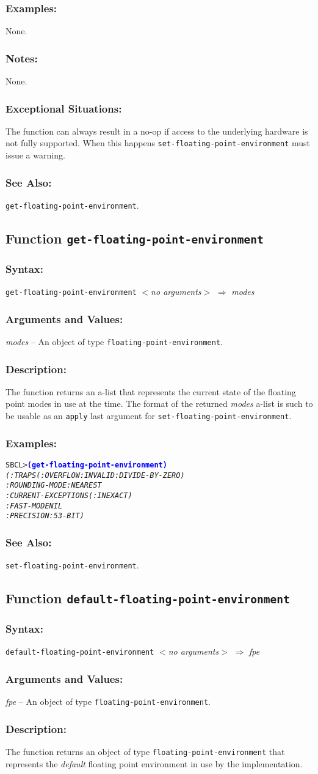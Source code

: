 \documentclass[10pt,fleqn]{article}
\newcommand{\code}[1]{\texttt{#1}}
\newcommand{\varname}[1]{\textit{#1}}
\newcommand{\codeprompt}[1]{\textcolor{blue}{\textbf{#1}}}
\newcommand{\DDictionaryItem}[1]{\vspace*{6pt}\noindent\hrulefill\vspace*{-9pt}\subsection*{#1}}
\newcommand{\DSyntax}{\subsubsection*{Syntax:}}
\newcommand{\DArgsNValues}{\subsubsection*{Arguments and Values:}}
\newcommand{\DDescription}{\subsubsection*{Description:}}
\newcommand{\DExamples}{\subsubsection*{Examples:}}
\newcommand{\DExceptional}{\subsubsection*{Exceptional Situations:}}
\newcommand{\DNotes}{\subsubsection*{Notes:}}
\newcommand{\DSeeAlso}{\subsubsection*{See Also:}}
\begin{document}
\DExamples{}

None.


\DNotes{}

None.


\DExceptional{}

The function can always result in a no-op if access to the underlying
hardware is not fully supported.  When this happens
\code{set-floating-point-environment} must issue a warning.


\DSeeAlso{}

\code{get-floating-point-environment}.


\DDictionaryItem{Function \code{get-floating-point-environment}}

\DSyntax{}

\code{get-floating-point-environment} \textit{$<$no arguments$>$}
$\Rightarrow$ \varname{modes}

\DArgsNValues{}

\varname{modes} --  An object of type \code{floating-point-environment}.


\DDescription{}

The function returns an a-list that represents the current state of
the floating point modes in use at the time.  The format of the
returned \varname{modes} a-list is such to be
usable as an \code{apply} last argument for
\code{set-floating-point-environment}.


\DExamples{}

\begin{alltt}
SBCL> \codeprompt{(get-floating-point-environment)}
\textit{(:TRAPS (:OVERFLOW :INVALID :DIVIDE-BY-ZERO)
 :ROUNDING-MODE :NEAREST
 :CURRENT-EXCEPTIONS (:INEXACT)
 :FAST-MODE NIL
 :PRECISION :53-BIT)}
\end{alltt}


\DSeeAlso{}

\code{set-floating-point-environment}.


\DDictionaryItem{Function \code{default-floating-point-environment}}

\DSyntax{}

\code{default-floating-point-environment} \textit{$<$no arguments$>$}
$\Rightarrow$ \varname{fpe}

\DArgsNValues{}

\varname{fpe} -- An object of type \code{floating-point-environment}.

\DDescription{}

The function returns an object of type
\code{floating-point-environment} that represents the \emph{default}
floating point environment in use by the implementation.
\end{document}
